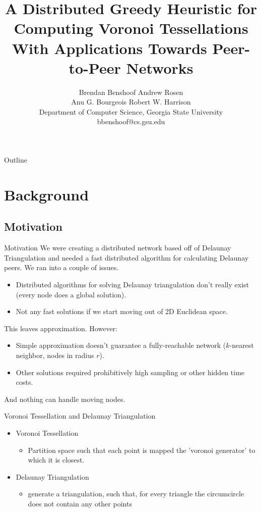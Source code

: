 \documentclass[8pt]{beamer}
\title{A Distributed Greedy Heuristic for Computing Voronoi Tessellations With Applications Towards Peer-to-Peer Networks}
\author{Brendan Benshoof \qquad Andrew Rosen \qquad \\Anu G. Bourgeois \qquad Robert W. Harrison \\Department of Computer Science, Georgia State University \\ bbenshoof@cs.gsu.edu}
\begin{document}
	\maketitle
	
	
	
\begin{frame}{Outline}
	\tableofcontents
\end{frame}
	
	
\section{Background}
\subsection{Motivation}
	
	\begin{frame}{Motivation}
		We were creating a distributed network based off of Delaunay Triangulation and needed a fast distributed algorithm for calculating Delaunay peers.
		We ran into a couple of issues.
		\begin{itemize}
			\item Distributed algorithms for solving Delaunay triangulation don't really exist (every node does a global solution).
			\item Not any fast solutions if we start moving out of 2D Euclidean space.
		\end{itemize}
		This leaves approximation.  However:
		\begin{itemize}
			\item Simple approximation doesn't guarantee a fully-reachable network ($k$-nearest neighbor, nodes in radius $r$).
			\item Other solutions \cite{voronet} required prohibitively high sampling or other hidden time costs.
		\end{itemize}
		And nothing can handle moving nodes.
	\end{frame}		
	
	\begin{frame}{Voronoi Tessellation and Delaunay Triangulation}
		\begin{itemize}
			\item Voronoi Tessellation
				\begin{itemize}
					\item Partition space such that each point is mapped the 'voronoi generator' to which it is closest.
				\end{itemize}
			\item Delaunay Triangulation
				\begin{itemize}
					\item generate a triangulation, such that, for every triangle the circumcircle does not contain any other points 
				\end{itemize}
		\end{itemize}
	\end{frame}
			
\end{document}
